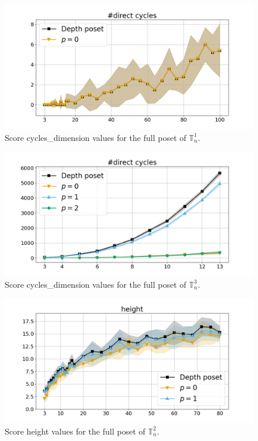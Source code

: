 \documentclass{article}
\begin{document}
    \begin{figure}[h!]
        \centering
        \hspace*{-0.24\textwidth}
        \includegraphics[width=1.4\textwidth]{pics/extended torus scores/score=cycles-dimension, dim=1, object=full.png}
        \caption{Score cycles\_dimension values for the full poset of $\mathbb{T}_n^{1}$.}
        \label{fig:cyclesdimension-full1}
    \end{figure}
    \begin{figure}[h!]
        \centering
        \hspace*{-0.24\textwidth}
        \includegraphics[width=1.4\textwidth]{pics/extended torus scores/score=cycles-dimension, dim=3, object=full.png}
        \caption{Score cycles\_dimension values for the full poset of $\mathbb{T}_n^{3}$.}
        \label{fig:cyclesdimension-full3}
    \end{figure}
    \begin{figure}[h!]
        \centering
        \hspace*{-0.24\textwidth}
        \includegraphics[width=1.4\textwidth]{pics/extended torus scores/score=height, dim=2, object=full.png}
        \caption{Score height values for the full poset of $\mathbb{T}_n^{2}$.}
        \label{fig:height-full2}
    \end{figure}
\end{document}
